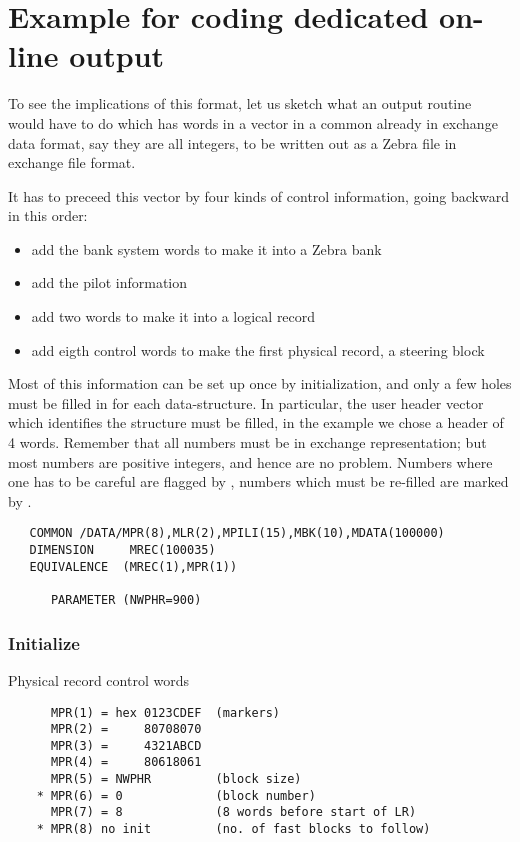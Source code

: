 \section{Example for coding dedicated on-line output}

To see the implications of this format, let us sketch what
an output routine would have to do which has  words
in a vector  in a common  already in exchange data format,
say they are all integers,
to be written out as a Zebra file in exchange file format.

It has to preceed this vector by four kinds of control information,
going backward in this order:

\begin{itemize}
\item add the bank system words to make it into a Zebra bank
\item add the pilot information
\item add two words to make it into a logical record
\item add eigth control words to make the first physical record,
      a steering block
\end{itemize}

Most of this information can be set up once by initialization,
and only a few holes must be filled in for each data-structure.
In particular, the user header vector which identifies the
structure must be filled,
in the example we chose a header of 4 words.
Remember that all numbers must be in exchange representation;
but most numbers are positive integers, and hence are no problem.
Numbers where one has to be careful are flagged by \Lit{!!},
numbers which must be re-filled are marked by \Lit{*}.

\begin{verbatim}
   COMMON /DATA/MPR(8),MLR(2),MPILI(15),MBK(10),MDATA(100000)
   DIMENSION     MREC(100035)
   EQUIVALENCE  (MREC(1),MPR(1))

      PARAMETER (NWPHR=900)
\end{verbatim}

\subsubsection*{Initialize}

Physical record control words

\begin{verbatim}
      MPR(1) = hex 0123CDEF  (markers)
      MPR(2) =     80708070
      MPR(3) =     4321ABCD
      MPR(4) =     80618061
      MPR(5) = NWPHR         (block size)
    * MPR(6) = 0             (block number)
      MPR(7) = 8             (8 words before start of LR)
    * MPR(8) no init         (no. of fast blocks to follow)
\end{verbatim}

